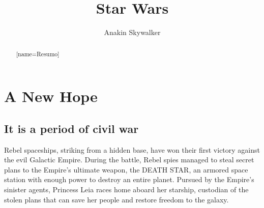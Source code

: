 \documentclass[oneside]{ifgw}
\title{Star Wars}
\author{Anakin Skywalker}
\institute{Instituto de Física ``Gleb Wataghin''}
\begin{document}

\maketitle
{}

\begin{abstract}[name=Resumo]
\lipsum[1-2]
\end{abstract}

\begin{abstract}
\lipsum[1-2]
\end{abstract}

\tableofcontents


\chapter{A New Hope}

\section{It is a period of civil war}

Rebel spaceships, striking from a hidden base, have won their first victory against the evil Galactic Empire.  During the battle, Rebel spies managed to steal secret plans to the Empire's ultimate weapon, the DEATH STAR, an armored space station with enough power to destroy an entire planet. Pursued by the Empire's sinister agents, Princess Leia races home aboard her starship, custodian of the stolen plans that can save her people and restore freedom to the galaxy.
\end{document}
